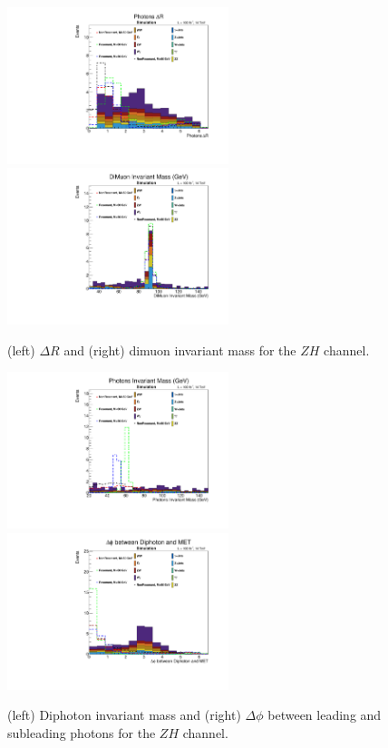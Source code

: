 \documentclass[11pt]{article}
\begin{document}
\begin{figure}[htbp]
\centering
\includegraphics[height=1.8in]{figs/plots_zh/Photon_dr.pdf}
\includegraphics[height=1.8in]{figs/plots_zh/dimuon_mass.pdf}
\caption{(left) $\Delta R$ and (right) dimuon invariant mass for the $ZH$ channel.}
\label{fig:Photon_dr}
\end{figure}

\begin{figure}[htbp]
\centering
\includegraphics[height=1.8in]{figs/plots_zh/Photon_iMass.pdf}
\includegraphics[height=1.8in]{figs/plots_zh/dphi_ggMET_real.pdf}
\caption{(left) Diphoton invariant mass and (right) $\Delta \phi$ between leading and subleading photons  for the $ZH$ channel.}
\label{fig:Photon_iMass}
\end{figure}
\end{document}
